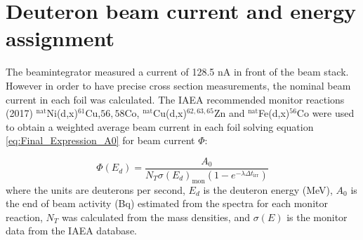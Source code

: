\section{Deuteron beam current and energy assignment} \label{sec:beamcurrent}
The beamintegrator measured a current of 128.5 nA in front of the beam stack. However in order to have precise cross section measurements, the nominal beam current in each foil was calculated. The IAEA recommended monitor reactions (2017) $^\text{nat}$Ni(d,x)$^{61}$Cu,$56,58$Co, $^\text{nat}$Cu(d,x)$^{62,63,65}$Zn and $^\text{nat}$Fe(d,x)$^{56}$Co \cite{Hermanne2018a} were used to obtain a weighted average beam current in each foil solving equation \ref{eq:Final_Expression_A0} for beam current $\Phi$:

\begin{equation} \label{eq:BC_simple}
    \Phi(E_d) = \frac{A_0}{N_T \sigma(E_d)_\text{mon}(1-e^{-\lambda \Delta t_\text{irr}})}
\end{equation}
\noindent 
where the units are deuterons per second, $E_d$ is the deuteron energy (MeV), $A_0$ is the end of beam activity (Bq) estimated from the spectra for each monitor reaction, $N_T$ was calculated from the mass densities, and $\sigma(E)$ is the monitor data from the IAEA database. \\

